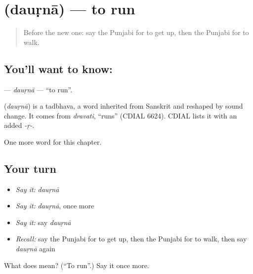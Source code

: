 \section[\texorpdfstring{\pa{ਦੌੜਨਾ} (dauṛnā)}{ਦੌੜਨਾ (dauṛnā)}]{ (dauṛnā) — to run}

\label{lesson:PA-C57-daurna}



\begin{quote}
Before the new one: say the Punjabi for to get up, then the Punjabi for to walk.
\end{quote}

\subsection*{You'll want to know: }
\textbf{} — \emph{dauṛnā} — \textquotedblleft{}to run\textquotedblright{}.

\begin{cousinweb}
\textbf{} (\emph{dauṛnā}) is a tadbhava, a word inherited from Sanskrit and reshaped by sound change. It comes from \emph{dravati}, \textquotedblleft{}runs\textquotedblright{} (CDIAL 6624). CDIAL lists it with an added \emph{-ṛ-}.
\end{cousinweb}

\begin{grammarlens}[title={What you've built}]
One more word for this chapter.
\end{grammarlens}

\subsection*{Your turn}
\begin{itemize}
\raggedright
  \item \emph{Say it:} \emph{dauṛnā}
  \item \emph{Say it:} \emph{dauṛnā}, once more
  \item \emph{Say it:} say \emph{dauṛnā}
  \item \emph{Recall:} say the Punjabi for to get up, then the Punjabi for to walk, then say \emph{dauṛnā} again
\end{itemize}

\begin{tcolorbox}[breakable,colback=teal!4,colframe=teal!35!black,title={Before you move on}]
What does  mean? (\textquotedblleft{}To run\textquotedblright{}.) Say it once more.
\end{tcolorbox}
